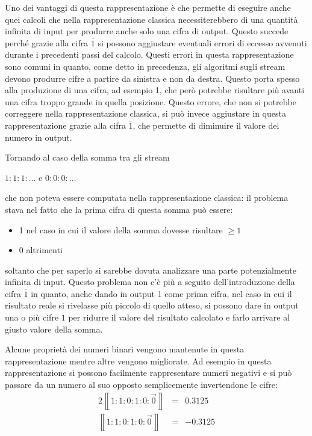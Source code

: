 \documentclass[Lau]{sapthesis}
\begin{document}
Uno dei vantaggi di questa rappresentazione è che permette di eseguire anche quei 
calcoli che nella rappresentazione classica necessiterebbero di una quantità 
infinita di input per produrre anche solo una cifra di output. Questo succede 
perché grazie alla cifra $\overline{1}$ si possono aggiustare eventuali errori di eccesso avvenuti durante i precedenti passi del calcolo. Questi errori in questa rappresentazione sono comuni in quanto, come detto in precedenza, gli algoritmi sugli stream devono produrre cifre a partire da sinistra e non da destra. Questo porta spesso alla produzione di una cifra, ad esempio 1, che però potrebbe risultare più avanti una cifra troppo grande in quella posizione. Questo errore, che non si potrebbe correggere nella rappresentazione classica, si può invece aggiustare in questa rappresentazione grazie alla cifra $\overline{1}$, che permette di diminuire il valore del numero in output.

Tornando al caso della somma tra gli stream
\begin{center}
$1:1:1:\ldots$ \hspace{0.5cm} e \hspace{0.5cm} $0:0:0:\ldots$
\end{center}
che non poteva essere computata nella rappresentazione classica: il problema stava nel fatto che la prima cifra di questa somma può essere:
\begin{itemize}
\item 1 nel caso in cui il valore della somma dovesse risultare $\geq1$
\item 0 altrimenti
\end{itemize}
soltanto che per saperlo si sarebbe dovuta analizzare una parte potenzialmente infinita di input. Questo problema non c'è più a seguito dell'introduzione della cifra $\overline{1}$ in quanto, anche dando in output 1 come prima cifra, nel caso in cui il risultato reale si rivelasse più piccolo di quello atteso, si possono dare in output una o più cifre $\overline{1}$ per ridurre il valore del risultato calcolato e farlo arrivare al giusto valore della somma.

Alcune proprietà dei numeri binari vengono mantenute in questa rappresentazione mentre altre vengono migliorate. Ad esempio in questa rappresentazione si possono facilmente rappresentare numeri negativi e si può passare da un numero al suo opposto semplicemente invertendone le cifre:
\begin{alignat*}{2}
\left\llbracket1:\overline{1}:0:1:0:\overrightarrow{0}\right\rrbracket &{}={}& 0.3125\\
\left\llbracket\overline{1}:1:0:\overline{1}:0:\overrightarrow{0}\right\rrbracket &{}={}& -0.3125
\end{alignat*}
\end{document}
